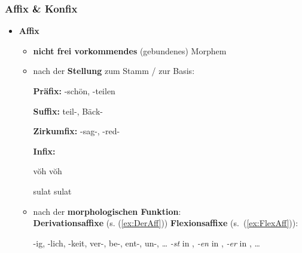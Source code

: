 \begin{frame}
\frametitle{Affix \& Konfix}

\begin{itemize}
	\item \textbf{Affix}
	
	\begin{itemize}
		\item \textbf{nicht frei vorkommendes} (gebundenes) Morphem
		
		\item nach der \textbf{Stellung} zum Stamm / zur Basis:
		
		\settowidth{} 
		\ea
			\ea \textbf{Präfix:} -schön, -teilen
		
			\ex \textbf{Suffix:} teil-, Bäck-
		
			\ex \textbf{Zirkumfix:} -sag-, -red-
		
			\ex \textbf{Infix:} 
			
			 v\u{o}h  \ras v\u{o}h  
			 
			sulat  \ras sulat  
		
			\z 
		\z 

\pause 
		
		\item nach der \textbf{morphologischen Funktion}: \\
		\textbf{Derivationsaffixe} (s. (\ref{ex:DerAff})) \vs \textbf{Flexionsaffixe} (s.\ (\ref{ex:FlexAff})):
		
		\ea 
		\ea\label{ex:DerAff} -ig, -lich, -keit, ver-, be-, ent-, un-, \dots
		\ex\label{ex:FlexAff} \emph{-st} in , \emph{-en} in , \emph{-er} in , \dots
		\z
		\z 
	\end{itemize}
\end{itemize}
\end{frame}


